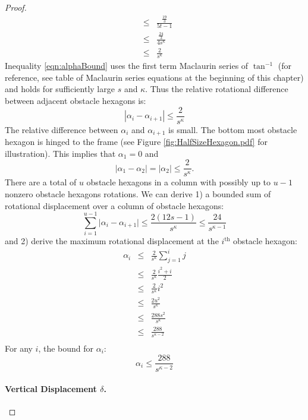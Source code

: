 \documentclass[10pt]{CSUNthesis}
\theoremstyle{plain}%
\theoremstyle{definition}
\theoremstyle{remark}
\newcommand{\ith}{i^\text{th}}
\newcommand{\vlr}[1]{\left\vert #1 \right\vert}
\begin{document}
\begin{proof}
\begin{equation}
\begin{array}{rcl}
& \leq & \frac{\frac{19}{3}}{5t -1} \\
& \leq & \frac{\frac{24}{3}}{4s^\kappa} \\
&\leq& \frac{2}{s^\kappa}
\end{array} 
\end{equation}
Inequality \ref{eqn:alphaBound} uses the first term Maclaurin series of $\tan^{-1}$ (for reference, see table of Maclaurin series equations at the beginning of this chapter) and holds for sufficiently large $s$ and $\kappa$.  
Thus the relative rotational difference between adjacent obstacle hexagons is:
\begin{equation}\label{eqn:angularBound}
\left\vert \alpha_i - \alpha_{i+1} \right\vert \leq\frac{2}{s^\kappa}
\end{equation}
The relative difference between $\alpha_i$ and $\alpha_{i+1}$ is small.
The bottom most obstacle hexagon is hinged to the frame (see Figure \ref{fig:HalfSizeHexagon.pdf} for illustration). 
This implies that $\alpha_1 = 0$ and
$$\vlr{\alpha_1 - \alpha_2}=\vlr{\alpha_2}\leq \frac{2}{s^\kappa}.$$
There are a total of $u$ obstacle hexagons in a column with possibly up to $u-1$ nonzero obstacle hexagons rotations.
We can derive 1) a bounded sum of rotational displacement over a column of obstacle hexagons:
\begin{equation}\label{eqn:angularSumBound}
\sum_{i=1}^{u-1} \vert \alpha_i - \alpha_{i+1} \vert \leq \frac{2(12s-1)}{s^\kappa} \leq \frac{24}{s^{\kappa-1}}
\end{equation}
and 2) derive the maximum rotational displacement at the $\ith$ obstacle hexagon:
\begin{eqnarray*}
\alpha_i &\leq& \frac{2}{s^\kappa} \sum_{j=1}^i j\\
		 &\leq& \frac{2}{s^\kappa}  \frac{i^2+i}{2}\\
		 &\leq& \frac{2}{s^\kappa}  i^2\\
		 &\leq& \frac{2u^2}{s^\kappa}\\
		 &\leq& \frac{288s^2}{s^{\kappa}}\\
		 &\leq& \frac{288}{s^{\kappa-2}} \\
\end{eqnarray*}
For any $i$, the bound for $\alpha_i$:
\begin{equation}\label{eqn:angularMaxBound}
\alpha_i \leq \frac{288}{s^{\kappa-2}}
\end{equation}

\paragraph{Vertical Displacement $\delta$.}


\end{proof}
\end{document}

